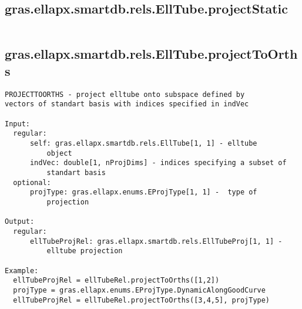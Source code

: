 \subsection{\texorpdfstring{gras.ellapx.smartdb.rels.EllTube.projectStatic}{projectStatic}}\label{method:gras.ellapx.smartdb.rels.EllTube.projectStatic}
\begin{verbatim}

\end{verbatim}
\subsection{\texorpdfstring{gras.ellapx.smartdb.rels.EllTube.projectToOrths}{projectToOrths}}\label{method:gras.ellapx.smartdb.rels.EllTube.projectToOrths}
\begin{verbatim}
PROJECTTOORTHS - project elltube onto subspace defined by
vectors of standart basis with indices specified in indVec

Input:
  regular:
      self: gras.ellapx.smartdb.rels.EllTube[1, 1] - elltube
          object
      indVec: double[1, nProjDims] - indices specifying a subset of
          standart basis
  optional:
      projType: gras.ellapx.enums.EProjType[1, 1] -  type of
          projection

Output:
  regular:
      ellTubeProjRel: gras.ellapx.smartdb.rels.EllTubeProj[1, 1] -
          elltube projection

Example:
  ellTubeProjRel = ellTubeRel.projectToOrths([1,2])
  projType = gras.ellapx.enums.EProjType.DynamicAlongGoodCurve
  ellTubeProjRel = ellTubeRel.projectToOrths([3,4,5], projType)
\end{verbatim}
